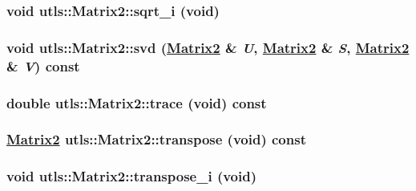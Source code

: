 \hypertarget{classutls_1_1Matrix2_bc6d5983fbb5c48c8b619f2a2392ffdf}{
\subsubsection[sqrt\_\-i]{\setlength{\rightskip}{0pt plus 5cm}void utls::Matrix2::sqrt\_\-i (void)}}
\label{classutls_1_1Matrix2_bc6d5983fbb5c48c8b619f2a2392ffdf}


\hypertarget{classutls_1_1Matrix2_8ec4a8dd5ba1a135ab8de1dfc2ec2708}{
\subsubsection[svd]{\setlength{\rightskip}{0pt plus 5cm}void utls::Matrix2::svd (\hyperlink{classutls_1_1Matrix2}{Matrix2} \& {\em U}, \hyperlink{classutls_1_1Matrix2}{Matrix2} \& {\em S}, \hyperlink{classutls_1_1Matrix2}{Matrix2} \& {\em V}) const}}
\label{classutls_1_1Matrix2_8ec4a8dd5ba1a135ab8de1dfc2ec2708}


\hypertarget{classutls_1_1Matrix2_64f5d010430d2755c5614eb276701f41}{
\subsubsection[trace]{\setlength{\rightskip}{0pt plus 5cm}double utls::Matrix2::trace (void) const}}
\label{classutls_1_1Matrix2_64f5d010430d2755c5614eb276701f41}


\hypertarget{classutls_1_1Matrix2_bdeafc2639007eb4759ba5319ee50fe2}{
\subsubsection[transpose]{\setlength{\rightskip}{0pt plus 5cm}\hyperlink{classutls_1_1Matrix2}{Matrix2} utls::Matrix2::transpose (void) const}}
\label{classutls_1_1Matrix2_bdeafc2639007eb4759ba5319ee50fe2}


\hypertarget{classutls_1_1Matrix2_46b9abb57011a56f91c680290d74edbf}{
\subsubsection[transpose\_\-i]{\setlength{\rightskip}{0pt plus 5cm}void utls::Matrix2::transpose\_\-i (void)}}
\label{classutls_1_1Matrix2_46b9abb57011a56f91c680290d74edbf}




